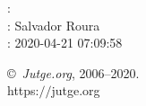 \documentclass[11pt]{article}
\begin{document}
    \newcommand{\SampleTwoCol}{\SampleTwoColInputOutput{sample}{}}
    \newcommand{\SampleOneCol}{\SampleOneColInputOutput{sample}{}}

    \ProblemInformation
    \Author: \\    \Translator: Salvador Roura\\
    \Generation: 2020-04-21 07:09:58

    \bigskip

    \copyright\ \emph{Jutge.org}, 2006--2020. \\
    https:$/\!\!/$jutge.org
\end{document}
